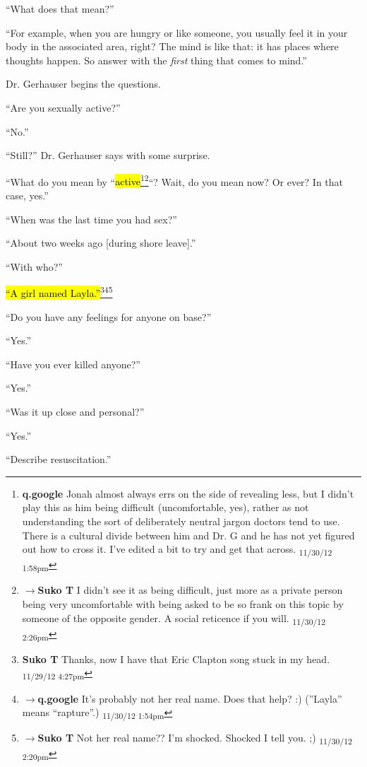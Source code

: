 ``What does that mean?''

``For example, when you are hungry or like someone, you usually feel it in your body in the associated area, right?  The mind is like that: it has places where thoughts happen. So answer with the \textit{first} thing that comes to mind.''

Dr. Gerhauser begins the questions.

``Are you sexually active?''

``No.''

``Still?'' Dr. Gerhauser says with some surprise.

``What do you mean by ``\hl{active}\footnote{\textbf{q.google }Jonah almost always errs on the side of revealing less, but I didn't play this as him being difficult (uncomfortable, yes), rather as not understanding the sort of deliberately neutral jargon doctors tend to use.  There is a cultural divide between him and Dr. G and he has not yet figured out how to cross it.  I've edited a bit to try and get that across. \textsubscript{11/30/12 1:58pm}}\footnote{$\rightarrow$\textbf{Suko T }I didn't see it as being difficult, just more as a private person being very uncomfortable with being asked to be so frank on this topic by someone of the opposite gender.  A social reticence if you will. \textsubscript{11/30/12 2:26pm}}``?  Wait, do you mean now?  Or ever?  In that case, yes.''

``When was the last time you had sex?''

``About two weeks ago {[}during shore leave{]}.''

``With who?''

\hl{``A girl named Layla.''}\footnote{\textbf{Suko T }Thanks, now I have that Eric Clapton song stuck in my head. \textsubscript{11/29/12 4:27pm}}\footnote{$\rightarrow$\textbf{q.google }It's probably not her real name.  Does that help? :)
(''Layla'' means ``rapture''.) \textsubscript{11/30/12 1:54pm}}\footnote{$\rightarrow$\textbf{Suko T }Not her real name??  I'm shocked.  Shocked I tell you. ;) \textsubscript{11/30/12 2:20pm}}

``Do you have any feelings for anyone on base?''

``Yes.''

``Have you ever killed anyone?''

``Yes.''

``Was it up close and personal?''

``Yes.''

``Describe resuscitation.''  

